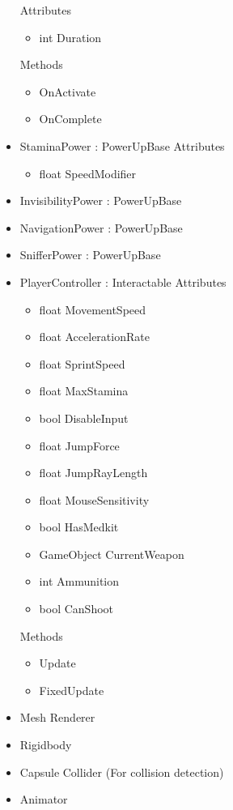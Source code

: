 \documentclass[11pt]{article}
\begin{document}
\begin{itemize}
	\newline Attributes
	\begin{itemize}
		\item int Duration
	\end{itemize}
	Methods
	\begin{itemize}
		\item OnActivate
		\item OnComplete
	\end{itemize}
	\item StaminaPower : PowerUpBase
	\newline Attributes
	\begin{itemize}
		\item float SpeedModifier
	\end{itemize}
	\item InvisibilityPower : PowerUpBase
	\item NavigationPower : PowerUpBase
	\item SnifferPower : PowerUpBase
	\item PlayerController : Interactable
	\newline Attributes
	\begin{itemize}
		\item float MovementSpeed
		\item float AccelerationRate
		\item float SprintSpeed
		\item float MaxStamina
		\item bool DisableInput
		\item float JumpForce
		\item float JumpRayLength
		\item float MouseSensitivity
		\item bool HasMedkit
		\item GameObject CurrentWeapon
		\item int Ammunition
		\item bool CanShoot
	\end{itemize}
	Methods
	\begin{itemize}
		\item Update
		\item FixedUpdate
	\end{itemize}
	\item Mesh Renderer
	\item Rigidbody
	\item Capsule Collider (For collision detection)
	\item Animator
\end{itemize}
\end{document}
